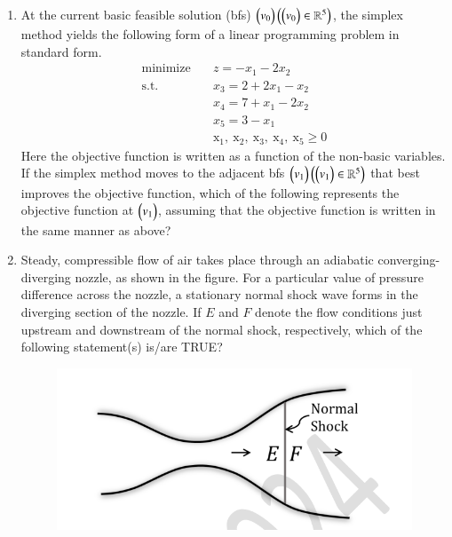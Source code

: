 \documentclass[journal]{IEEEtran}
\begin{document}
\begin{enumerate}[leftmargin=0pt]
\vspace{4mm}

\item
At the current basic feasible solution (bfs) $\begin{pmatrix}v_0\end{pmatrix} \left(\begin{pmatrix}v_0\end{pmatrix} \in \mathbb{R}^5\right)$, the simplex method yields the following form of a linear programming problem in standard form.
\begin{align*}
\text{minimize} \quad &z = -x_1 - 2x_2 \\
\text{s.t.}\quad\quad
&x_3 = 2 + 2x_1 - x_2 \\
&x_4 = 7 + x_1 - 2x_2 \\
&x_5 = 3 - x_1 \\
&\text{x}_1,\ \text{x}_2,\ \text{x}_3,\ \text{x}_4,\ \text{x}_5 \geq 0
\end{align*}
Here the objective function is written as a function of the non-basic variables. If the simplex method moves to the adjacent bfs $\begin{pmatrix}v_1\end{pmatrix} \left(\begin{pmatrix}v_1\end{pmatrix} \in \mathbb{R}^5\right)$ that best improves the objective function, which of the following represents the objective function at $\begin{pmatrix}v_1\end{pmatrix}$, assuming that the objective function is written in the same manner as above?

\vspace{2mm}

\begin{enumerate}
\end{enumerate}

\hfill{}

\vspace{4mm}

\item
Steady, compressible flow of air takes place through an adiabatic converging-diverging nozzle, as shown in the figure. For a particular value of pressure difference across the nozzle, a stationary normal shock wave forms in the diverging section of the nozzle. If $E$ and $F$ denote the flow conditions just upstream and downstream of the normal shock, respectively, which of the following statement(s) is/are TRUE?

\begin{figure}[h]
\includegraphics[width=0.45\columnwidth]{Figs/image (71).png}
\caption*{}
\label{fig:q40}
\end{figure}


\end{enumerate}
\end{document}
